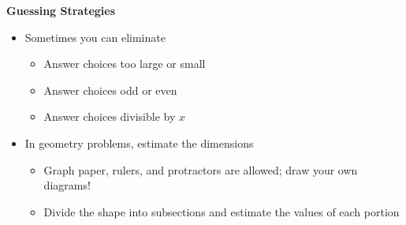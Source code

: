 \documentclass[11pt,letterpaper]{article}
\begin{document}
\begin{minipage}{\textwidth}
     \noindent \textbf{Guessing Strategies}
     \begin{itemize}
          \item Sometimes you can eliminate
          \begin{itemize}
               \item Answer choices too large or small
               \item Answer choices odd or even
               \item Answer choices divisible by $x$
          \end{itemize}
          \item In geometry problems, estimate the dimensions
          \begin{itemize}
               \item Graph paper, rulers, and protractors are allowed; draw your own diagrams!
               \item Divide the shape into subsections and estimate the values of each portion
          \end{itemize}
        \end{itemize}
\end{minipage}
\end{document}
